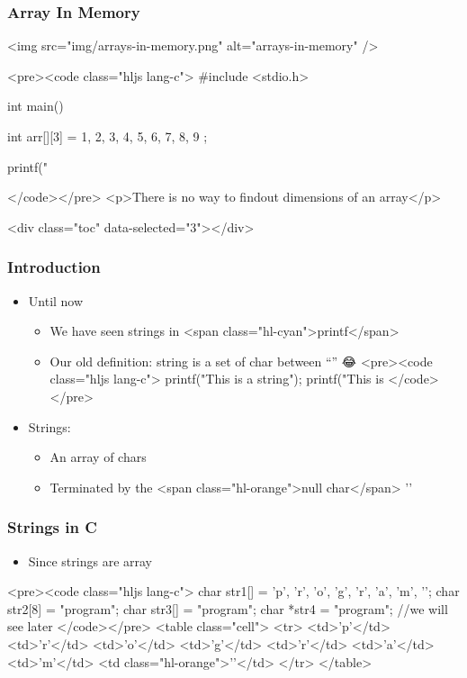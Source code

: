 \documentclass{../c-lecture}
\begin{document}
\begin{frame}
  \begin{frame}
    \frametitle{Array In Memory}
    <img src="img/arrays-in-memory.png" alt="arrays-in-memory" />
  \end{frame}
  \begin{frame}
    <pre><code class="hljs lang-c">
#include <stdio.h>


int main() {
  int arr[][3] = { {1, 2, 3}, {4, 5, 6}, {7, 8, 9} };

  printf("%
}
    </code></pre>
    <p>There is no way to findout dimensions of an array</p>
  \end{frame}
\end{frame}
\begin{frame}
  <div class="toc" data-selected="3"></div>
\end{frame}
\begin{frame}
  \frametitle{Introduction}
  \begin{itemize}
    \item Until now
    \begin{itemize}
      \item We have seen strings in <span class="hl-cyan">printf</span>
      \item Our old definition: string is a set of char between “” 😂
      <pre><code class="hljs lang-c">
printf("This is a string\n");
printf("This is %
      </code></pre>
    \end{itemize}
    \item Strings:
    \begin{itemize}
      \item An array of chars
      \item Terminated by the <span class="hl-orange">null char</span> '\0'
    \end{itemize}
  \end{itemize}
\end{frame}
\begin{frame}
  \frametitle{Strings in C}
  \begin{itemize}
    \item Since strings are array
  \end{itemize}
  <pre><code class="hljs lang-c">
char str1[] = {'p', 'r', 'o', 'g', 'r', 'a', 'm', '\0'};
char str2[8] = "program";
char str3[] = "program";
char *str4 = "program"; //we will see later
  </code></pre>
  <table class="cell">
    <tr>
      <td>'p'</td>
      <td>'r'</td>
      <td>'o'</td>
      <td>'g'</td>
      <td>'r'</td>
      <td>'a'</td>
      <td>'m'</td>
      <td class="hl-orange">'\0'</td>
    </tr>
  </table>
\end{frame}
\end{document}
